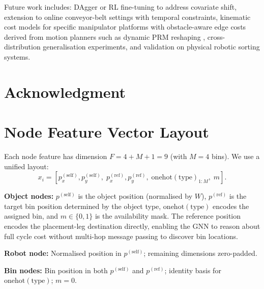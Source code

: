 \documentclass[conference]{IEEEtran}
\begin{document}
Future work includes: DAgger or RL fine-tuning to address covariate shift, extension to online conveyor-belt settings with temporal constraints, kinematic cost models for specific manipulator platforms \cite{han2019pap} with obstacle-aware edge costs derived from motion planners such as dynamic PRM reshaping \cite{ojha2025obstacle}, cross-distribution generalisation experiments, and validation on physical robotic sorting systems.

\section*{Acknowledgment}

\appendices
\section{Node Feature Vector Layout}\label{app:features}

Each node feature has dimension $F = 4 + M + 1 = 9$ (with $M{=}4$ bins). We use a unified layout:
\begin{equation}
x_i = [p^{(\text{self})}_x, p^{(\text{self})}_y,\; p^{(\text{ref})}_x, p^{(\text{ref})}_y,\; \text{onehot}(\text{type})_{1:M},\; m].
\end{equation}

\textbf{Object nodes:} $p^{(\text{self})}$ is the object position (normalised by $W$), $p^{(\text{ref})}$ is the target bin position determined by the object type, $\text{onehot}(\text{type})$ encodes the assigned bin, and $m \in \{0,1\}$ is the availability mask. The reference position encodes the placement-leg destination directly, enabling the GNN to reason about full cycle cost without multi-hop message passing to discover bin locations.

\textbf{Robot node:} Normalised position in $p^{(\text{self})}$; remaining dimensions zero-padded.

\textbf{Bin nodes:} Bin position in both $p^{(\text{self})}$ and $p^{(\text{ref})}$; identity basis for $\text{onehot}(\text{type})$; $m{=}0$.
\end{document}
